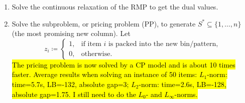 \documentclass{llncs}
\begin{document}
\begin{enumerate}
\item Solve the continuous relaxation of the RMP to get the dual values.
\item Solve the subproblem, or pricing problem (PP), to generate $S^{*} \subseteq \{1, \dots, n\}$ (the most promising new column). Let
\begin{equation}
  z_{i}\coloneqq
  \begin{cases}
    1, & \mbox{if item $i$ is packed into the new bin/pattern,} \\
    0, & \mbox{otherwise.}
  \end{cases}
\end{equation}
\hl{The pricing problem is now solved by a CP model and is about 10 times faster. Average results when solving an instance of 50 items: $L_1$-norm: time=5.7s, LB=-132, absolute gap=3; $L_2$-norm: time=2.6s, LB=-128, absolute gap=1.75. I still need to do the $L_{0}$- and $L_{\infty}$-norms.}


\end{enumerate}
\end{document}
